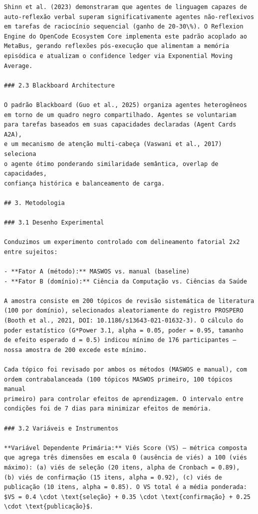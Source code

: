 \begin{lstlisting}[caption={Artigo exemplo gerado pelo MASWOS (excerto da introdução e metodologia)},label={lst:artigo-exemplo}]
Shinn et al. (2023) demonstraram que agentes de linguagem capazes de
auto-reflexão verbal superam significativamente agentes não-reflexivos
em tarefas de raciocínio sequencial (ganho de 20-30\%). O Reflexion
Engine do OpenCode Ecosystem Core implementa este padrão acoplado ao
MetaBus, gerando reflexões pós-execução que alimentam a memória
episódica e atualizam o confidence ledger via Exponential Moving Average.

### 2.3 Blackboard Architecture

O padrão Blackboard (Guo et al., 2025) organiza agentes heterogêneos
em torno de um quadro negro compartilhado. Agentes se voluntariam
para tarefas baseados em suas capacidades declaradas (Agent Cards A2A),
e um mecanismo de atenção multi-cabeça (Vaswani et al., 2017) seleciona
o agente ótimo ponderando similaridade semântica, overlap de capacidades,
confiança histórica e balanceamento de carga.

## 3. Metodologia

### 3.1 Desenho Experimental

Conduzimos um experimento controlado com delineamento fatorial 2x2
entre sujeitos:

- **Fator A (método):** MASWOS vs. manual (baseline)
- **Fator B (domínio):** Ciência da Computação vs. Ciências da Saúde

A amostra consiste em 200 tópicos de revisão sistemática de literatura
(100 por domínio), selecionados aleatoriamente do registro PROSPERO
(Booth et al., 2021, DOI: 10.1186/s13643-021-01632-3). O cálculo do
poder estatístico (G*Power 3.1, alpha = 0.05, poder = 0.95, tamanho
de efeito esperado d = 0.5) indicou mínimo de 176 participantes —
nossa amostra de 200 excede este mínimo.

Cada tópico foi revisado por ambos os métodos (MASWOS e manual), com
ordem contrabalanceada (100 tópicos MASWOS primeiro, 100 tópicos manual
primeiro) para controlar efeitos de aprendizagem. O intervalo entre
condições foi de 7 dias para minimizar efeitos de memória.

### 3.2 Variáveis e Instrumentos

**Variável Dependente Primária:** Viés Score (VS) — métrica composta
que agrega três dimensões em escala 0 (ausência de viés) a 100 (viés
máximo): (a) viés de seleção (20 itens, alpha de Cronbach = 0.89),
(b) viés de confirmação (15 itens, alpha = 0.92), (c) viés de
publicação (10 itens, alpha = 0.85). O VS total é a média ponderada:
$VS = 0.4 \cdot \text{seleção} + 0.35 \cdot \text{confirmação} + 0.25 \cdot \text{publicação}$.


\end{lstlisting}
